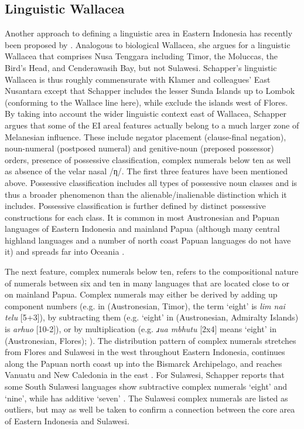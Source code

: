 \subsection{Linguistic Wallacea}\label{sec:wallacea}

Another approach to defining a linguistic area in Eastern Indonesia has recently been proposed by \citet{schapper2015wallacea}. Analogous to biological Wallacea, she argues for a linguistic Wallacea that comprises Nusa Tenggara including Timor, the Moluccas, the Bird’s Head, and Cenderawasih Bay, but not Sulawesi. Schapper's linguistic Wallacea is thus roughly commensurate with Klamer and colleagues' East Nusantara except that Schapper includes the lesser Sunda Islands up to Lombok (conforming to the Wallace line here), while \citet{klamer2008east} exclude the islands west of Flores. By taking into account the wider linguistic context east of Wallacea, Schapper argues that some of the EI areal features actually belong to a much larger zone of Melanesian influence. These include negator placement (clause-final negation), noun-numeral (postposed numeral) and genitive-noun (preposed possessor) orders, presence of possessive classification, complex numerals below ten as well as absence of the velar nasal /ƞ/. The first three features have been mentioned above. Possessive classification includes all types of possessive noun classes and is thus a broader phenomenon than the alienable/inalienable distinction which it includes. Possessive classification is further defined by distinct possessive constructions for each class. It is common in most Austronesian and Papuan languages of Eastern Indonesia and mainland Papua (although many central highland languages and a number of north coast Papuan languages do not have it) and spreads far into Oceania \citep[109]{schapper2015wallacea}.

\largerpage[1]
The next feature, complex numerals below ten, refers to the compositional nature of numerals between six and ten in many languages that are located close to or on mainland Papua. Complex numerals may either be derived by adding up component numbers (e.g. in  (Austronesian, Timor), the term `eight' is \textit{lim nai telu} [5+3]), by subtracting them (e.g. `eight' in  (Austronesian, Admiralty Islands) is \textit{arhuo} [10-2]), or by multiplication (e.g. \textit{ɹua mbhutu} [2x4] means `eight' in  (Austronesian, Flores); \citealt[113]{schapper2015wallacea}). The distribution pattern of complex numerals stretches from Flores and Sulawesi in the west throughout Eastern Indonesia, continues along the Papuan north coast up into the Bismarck Archipelago, and reaches Vanuatu and New Caledonia in the east \citep[112--4]{schapper2015wallacea}. For Sulawesi, Schapper reports that some South Sulawesi languages show subtractive complex numerals `eight' and `nine', while  has additive `seven' \citep[113f.]{schapper2015wallacea}. The Sulawesi complex numerals are listed as outliers, but may as well be taken to confirm a connection between the core area of Eastern Indonesia and Sulawesi.

